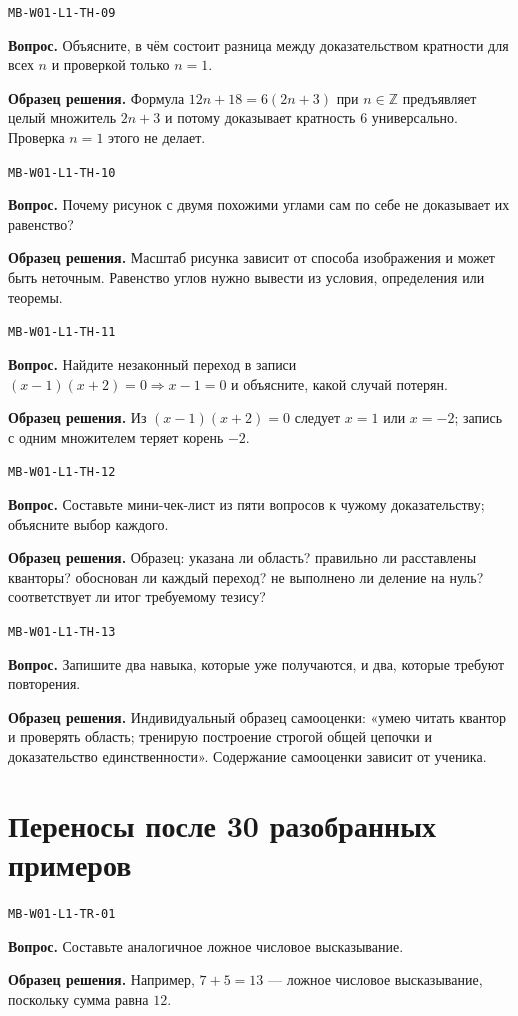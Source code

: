 \documentclass[11pt,a4paper,openany]{book}
\newcommand{\muid}[1]{\texttt{\footnotesize #1}}
\begin{document}
\noindent\muid{MB-W01-L1-TH-09}\par \textbf{Вопрос.} Объясните, в чём состоит разница между доказательством кратности для всех $n$ и проверкой только $n=1$.\par 
\textbf{Образец решения.} Формула $12n+18=6(2n+3)$ при $n\in\mathbb Z$ предъявляет целый множитель $2n+3$ и потому доказывает кратность $6$ универсально. Проверка $n=1$ этого не делает.\medskip

\noindent\muid{MB-W01-L1-TH-10}\par \textbf{Вопрос.} Почему рисунок с двумя похожими углами сам по себе не доказывает их равенство?\par 
\textbf{Образец решения.} Масштаб рисунка зависит от способа изображения и может быть неточным. Равенство углов нужно вывести из условия, определения или теоремы.\medskip

\noindent\muid{MB-W01-L1-TH-11}\par \textbf{Вопрос.} Найдите незаконный переход в записи $(x-1)(x+2)=0\Rightarrow x-1=0$ и объясните, какой случай потерян.\par 
\textbf{Образец решения.} Из $(x-1)(x+2)=0$ следует $x=1$ или $x=-2$; запись с одним множителем теряет корень $-2$.\medskip

\noindent\muid{MB-W01-L1-TH-12}\par \textbf{Вопрос.} Составьте мини-чек-лист из пяти вопросов к чужому доказательству; объясните выбор каждого.\par 
\textbf{Образец решения.} Образец: указана ли область? правильно ли расставлены кванторы? обоснован ли каждый переход? не выполнено ли деление на нуль? соответствует ли итог требуемому тезису?\medskip

\noindent\muid{MB-W01-L1-TH-13}\par \textbf{Вопрос.} Запишите два навыка, которые уже получаются, и два, которые требуют повторения.\par 
\textbf{Образец решения.} Индивидуальный образец самооценки: «умею читать квантор и проверять область; тренирую построение строгой общей цепочки и доказательство единственности». Содержание самооценки зависит от ученика.\medskip

\section{Переносы после 30 разобранных примеров}

\noindent\muid{MB-W01-L1-TR-01}\par \textbf{Вопрос.} Составьте аналогичное ложное числовое высказывание.\par 
\textbf{Образец решения.} Например, $7+5=13$ — ложное числовое высказывание, поскольку сумма равна $12$.\medskip
\end{document}
